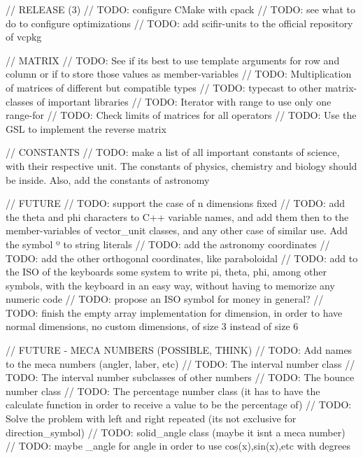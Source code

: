 // RELEASE (3) // TODO\+: configure CMake with cpack // TODO\+: see what to do to configure optimizations // TODO\+: add scifir-\/units to the official repository of vcpkg

// MATRIX // TODO\+: See if it\textquotesingle{}s best to use template arguments for row and column or if to store those values as member-\/variables // TODO\+: Multiplication of matrices of different but compatible types // TODO\+: typecast to other matrix-\/classes of important libraries // TODO\+: Iterator with range to use only one range-\/for // TODO\+: Check limits of matrices for all operators // TODO\+: Use the GSL to implement the reverse matrix

// CONSTANTS // TODO\+: make a list of all important constants of science, with their respective unit. The constants of physics, chemistry and biology should be inside. Also, add the constants of astronomy

// FUTURE // TODO\+: support the case of n dimensions fixed // TODO\+: add the theta and phi characters to C++ variable names, and add them then to the member-\/variables of vector\+\_\+unit classes, and any other case of similar use. Add the symbol º to string literals // TODO\+: add the astronomy coordinates // TODO\+: add the other orthogonal coordinates, like paraboloidal // TODO\+: add to the ISO of the keyboards some system to write pi, theta, phi, among other symbols, with the keyboard in an easy way, without having to memorize any numeric code // TODO\+: propose an ISO symbol for money in general? // TODO\+: finish the empty array implementation for dimension, in order to have normal dimensions, no custom dimensions, of size 3 instead of size 6

// FUTURE -\/ MECA NUMBERS (POSSIBLE, THINK) // TODO\+: Add names to the meca numbers (angler, laber, etc) // TODO\+: The interval number class // TODO\+: The interval number subclasses of other numbers // TODO\+: The bounce number class // TODO\+: The percentage number class (it has to have the calculate function in order to receive a value to be the percentage of) // TODO\+: Solve the problem with left and right repeated (it\textquotesingle{}s not exclusive for direction\+\_\+symbol) // TODO\+: solid\+\_\+angle class (maybe it isn\textquotesingle{}t a meca number) // TODO\+: maybe \+\_\+angle for angle in order to use cos(x),sin(x),etc with degrees

